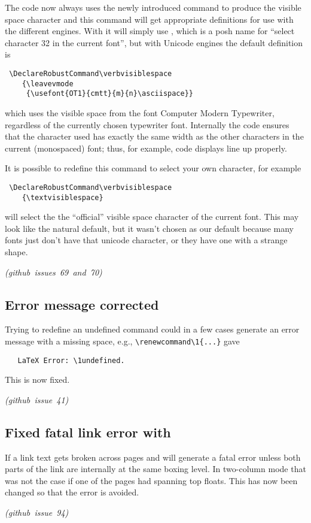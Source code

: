 \documentclass{ltnews}
\providecommand\LuaTeX{\hologo{LuaTeX}}
\providecommand\pdfTeX{\hologo{pdfTeX}}
\newcommand\githubissue[2][]{\ifhmode\unskip\fi
     \quad\penalty500\strut\nobreak\hfill
     \mbox{\small\itshape(github issue#1 #2)}\par}
\begin{document}
The  code now always uses the newly introduced command
 to produce the visible space character and this
command will get appropriate definitions for use with the different
engines.  With \pdfTeX{} it will simply use , which is
a posh name for ``select character 32 in the current font'', but with
Unicode engines the default definition is
\begin{verbatim}
 \DeclareRobustCommand\verbvisiblespace
    {\leavevmode
     {\usefont{OT1}{cmtt}{m}{n}\asciispace}}
\end{verbatim}
which uses the visible space from the font Computer Modern Typewriter,
regardless of the currently chosen typewriter font.  Internally the
code ensures that the character used has exactly the same width as the
other characters in the current (monospaced) font; thus, for example,
code displays line up properly.

It is possible to redefine this command to select your own character,
for example
\begin{verbatim}
 \DeclareRobustCommand\verbvisiblespace
    {\textvisiblespace}
\end{verbatim}
will select the the ``official'' visible space character of the
current font. This may look like the natural default, but it wasn't
chosen as our default because many fonts just don't have that unicode
character, or they have one with a strange shape.
%
\githubissue[s]{69 and 70}

        
\subsection{Error message corrected}
Trying to redefine an undefined command could in a few cases generate
an error message with a missing space, e.g.,
\verb=\renewcommand\1{...}= gave
\begin{verbatim}
   LaTeX Error: \1undefined.
\end{verbatim}
This is now fixed.
%
\githubissue{41}

        
\subsection{Fixed fatal link error with }

If a  link text gets broken across pages \pdfTeX{} and
\LuaTeX{} will generate a fatal error unless both parts of the link
are internally at the same boxing level. In two-column mode that was
not the case if one of the pages had spanning top floats. This has now
been changed so that the error is avoided.
%
\githubissue{94}
\end{document}
